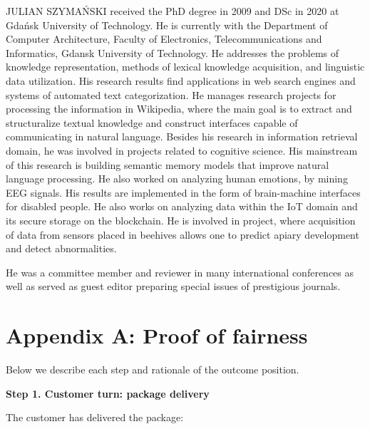 \documentclass{ieeeaccess}
\begin{document}
\begin{IEEEbiography}{JULIAN SZYMA{\'N}SKI}  received the PhD degree in 2009 and DSc in 2020 at Gdańsk University of Technology.
He is currently with the Department of Computer
Architecture, Faculty of Electronics, Telecommunications and Informatics, Gdansk University of Technology. He addresses the problems of knowledge representation, methods of lexical knowledge acquisition, and linguistic data utilization.
His research results find applications in web search engines and systems of automated text categorization. He manages research projects for processing the information in Wikipedia, where the main goal is to extract and structuralize textual knowledge and construct interfaces capable of communicating in natural language. Besides his research in information retrieval domain, he was involved in projects related to cognitive science. His mainstream of this research is building semantic memory models that improve natural language processing. He also worked on analyzing
human emotions, by mining EEG signals. His results are implemented in
the form of brain-machine interfaces for disabled people. He also works
on analyzing data within the IoT domain and its secure storage on the blockchain. 
He is involved in project, where acquisition of data from sensors placed in beehives  allows one to predict apiary development and detect abnormalities. 

He was a committee member and reviewer in  many international
conferences as well as served as guest editor preparing special issues of prestigious journals. 

\end{IEEEbiography}

\section*{Appendix A: Proof of fairness}\label{sec:proof-of-fairness}
Below we describe each step and rationale of the outcome position.

\noindent \textbf
{Step 1. Customer turn: package delivery}\label{step-1-deliver-package}

The customer has delivered the package:
\end{document}
